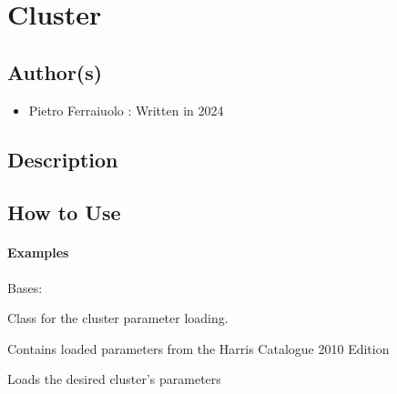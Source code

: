 \documentclass[letterpaper,10pt,english]{sphinxmanual}
\begin{document}
\sphinxstepscope


\chapter{Cluster}
\label{\detokenize{cluster:module-ggcas.cluster}}\label{\detokenize{cluster:cluster}}\label{\detokenize{cluster::doc}}

\section{Author(s)}
\label{\detokenize{cluster:author-s}}\begin{itemize}
\item {} 
\sphinxAtStartPar
Pietro Ferraiuolo : Written in 2024

\end{itemize}


\section{Description}
\label{\detokenize{cluster:description}}

\section{How to Use}
\label{\detokenize{cluster:how-to-use}}\subsubsection*{Examples}

\begin{fulllineitems}
\label{\detokenize{cluster:ggcas.cluster.Cluster}}
\pysigstartsignatures
{}
\pysigstopsignatures
\sphinxAtStartPar
Bases: 

\sphinxAtStartPar
Class for the cluster parameter loading.

\sphinxAtStartPar
Contains loaded parameters from the Harris Catalogue 2010 Edition


\begin{fulllineitems}

\pysigstartsignatures
{}
\pysigstopsignatures
\sphinxAtStartPar
Loads the desired cluster’s parameters

\end{fulllineitems}


\end{fulllineitems}
\end{document}
